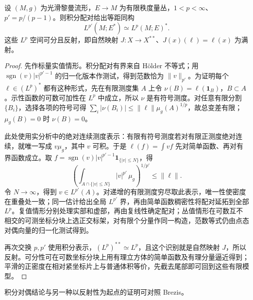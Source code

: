\begin{lemma}\label{g3:lem:lp-duality-reflexivity}
	设 \((M,g)\) 为光滑黎曼流形，\(E\to M\) 为有限秩度量丛，\(1<p<\infty\)、\(p'=p/(p-1)\)。则积分配对给出等距同构
	\[
		L^{p'}(M;E^*)\simeq L^p(M;E)^*.
	\]
	这些 \(L^p\) 空间可分且反射，即自然映射 \(J:X\to X^{**}\)、\(J(x)(\ell)=\ell(x)\) 为满射。
\end{lemma}
\begin{proof}
	先作标量实值情形。积分配对有界来自 Hölder 不等式；用 \(\operatorname{sgn}(v)|v|^{p'-1}\) 的归一化版本作测试，得到范数恰为 \(\|v\|_{p'}\)。为证明每个 \(\ell\in(L^p)^*\) 都有这种形式，先在有限测度集 \(A\) 上令 \(\nu(B)=\ell(\mathbf1_B)\)，\(B\subset A\)。示性函数的可数可加性在 \(L^p\) 中成立，所以 \(\nu\) 是有符号测度。对任意有限分割 \(\{B_i\}\)，选择各项的符号可得
	\(\sum_i|\nu(B_i)|\le\|\ell\|\mu_g(A)^{1/p}\)，故总变差有限；\(\mu_g(B)=0\) 时 \(\nu(B)=0\)。

	此处使用实分析中的绝对连续测度表示：有限有符号测度若对有限正测度绝对连续，就唯一写成 \(v\mu_g\)，其中 \(v\) 可积。于是 \(\ell(f)=\int vf\) 先对简单函数、再对有界函数成立。取
	\(f=\operatorname{sgn}(v)|v|^{p'-1}\mathbf1_{\{|v|\le N\}}\)，得
	\[
		\left(\int_{A\cap\{|v|\le N\}}|v|^{p'}\,\mu_g\right)^{1/p'}\le\|\ell\|.
	\]
	令 \(N\to\infty\)，得到 \(v\in L^{p'}(A)\)。对递增的有限测度穷尽取此表示，唯一性使密度在重叠处一致；同一估计给出全局 \(L^{p'}\) 界，再由简单函数稠密性将配对延拓到全部 \(L^p\)。复值情形分别处理实部和虚部，再由复线性确定配对；丛值情形在可数互不相交的可测坐标分块上选正交标架，对有限个分量作同一构造，范数等式仍由点态对偶向量的归一化测试得到。

	再次交换 \(p,p'\) 使用积分表示，\((L^p)^{**}\simeq L^p\)，且这个识别就是自然映射 \(J\)，所以反射。可分性可在可数坐标分块上用有理立方体的简单函数及有理分量逼近得到；平滑的正密度在相对紧坐标片上与普通体积等价，先截去尾部即可回到这些有限模型。
\end{proof}

积分对偶结论与另一种以反射性为起点的证明可对照 Brezis\cite[第4.3节，定理4.11]{Brezis2011}。

